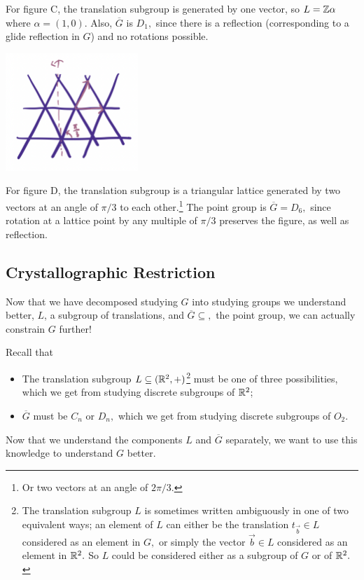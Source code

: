 \begin{example}[C]\label{example c}
For figure C, the translation subgroup is generated by one vector, so $L = \mathbb Z\alpha$ where $\alpha = (1, 0)$. Also, $\overline{G}$ is $D_1,$ since there is a reflection (corresponding to a glide reflection in $G$) and no rotations possible. 
\end{example}


\begin{center}
    \includegraphics[width=5cm]{Lecture Files and Images/lec16-latticetriangle.png}
\end{center}
\begin{example}[D]\label{example d}
For figure D, the translation subgroup is a triangular lattice generated by two vectors at an angle of $\pi/3$ to each other.\footnote{Or two vectors at an angle of $2\pi/3$.} The point group is $\overline{G} = D_6,$ since rotation at a lattice point by any multiple of $\pi/3$ preserves the figure, as well as reflection. 

\end{example}


\subsection{Crystallographic Restriction}
Now that we have decomposed studying $G$ into studying groups we understand better, $L$, a subgroup of translations, and $\overline{G} \subseteq,$ the point group, we can actually constrain $G$ further! 

Recall that 
\begin{itemize}
    \item The translation subgroup $L \subseteq (\mathbb R^2, +)$\footnote{The translation subgroup $L$ is sometimes written ambiguously in one of two equivalent ways; an element of $L$ can either be the translation $t_{\vec{b}} \in L$ considered as an element in $G,$ or simply the vector $\vec{b} \in L$ considered as an element in $\mathbb R^2.$ So $L$ could be considered either as a subgroup of $G$ or of $\mathbb R^2.$} must be one of three possibilities, which we get from studying discrete subgroups of $\mathbb R^2$; %
    \item  $\overline{G}$ must be $C_n$ or $D_n,$ which we get from studying discrete subgroups of $O_2.$
\end{itemize}
 Now that we understand the components $L$ and $\overline{G}$ separately, we want to use this knowledge to understand $G$ better. %

